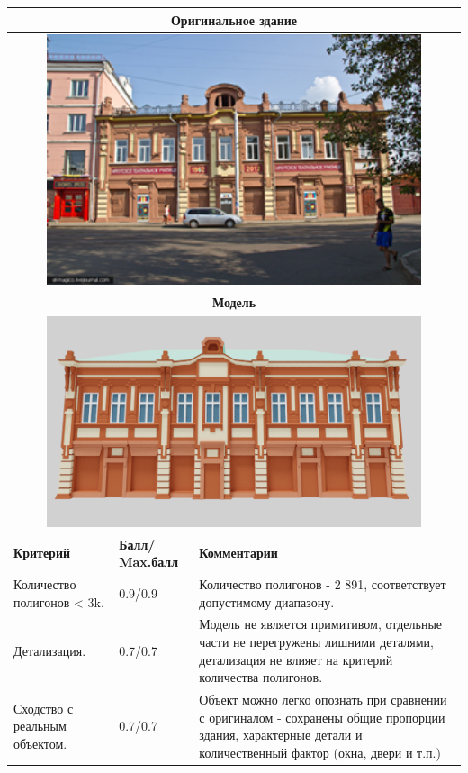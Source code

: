 \begin{longtable}{|p{4cm}|p{2.5cm}|p{7.5cm}|}
    \hline
    \multicolumn{3}{|c|}{\textbf{Оригинальное здание} } \\
    \hline
    \multicolumn{3}{|c|}{\includegraphics[width=11cm]{9}} \\
    \hline
    \multicolumn{3}{|c|}{\textbf{Модель}} \\
    \hline
    \multicolumn{3}{|c|}{\includegraphics[width=11cm]{src/model_10}} \\
    \hline
    \textbf{Критерий} & \textbf{Балл/ Max.балл} & \textbf{Комментарии} \\
    \hline
    Количество полигонов < 3k. & 0.9/0.9 & Количество полигонов - 2 891, соответствует допустимому диапазону. \\
    \hline
    Детализация. & 0.7/0.7 & Модель не является примитивом, отдельные части не перегружены лишними деталями, детализация не влияет на критерий количества полигонов. \\
    \hline
    Сходство с реальным объектом. & 0.7/0.7 & Объект можно легко опознать при сравнении с оригиналом - сохранены общие пропорции здания, характерные детали и количественный фактор (окна, двери и т.п.) \\

\end{longtable}
